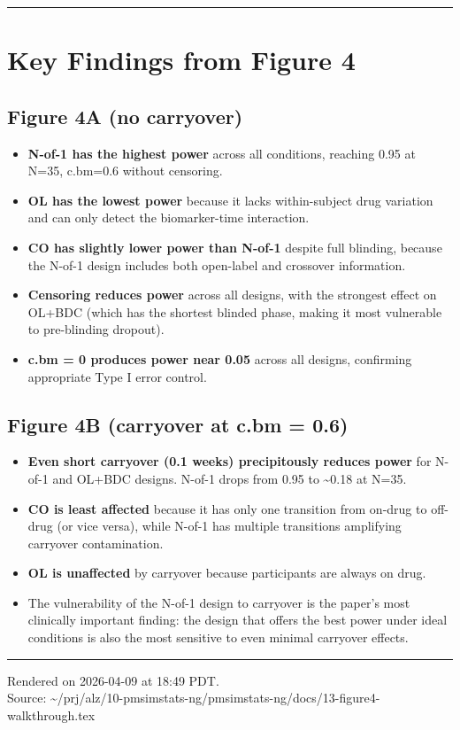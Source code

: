 \documentclass[11pt]{article}
\begin{document}
\bigskip\noindent\rule{\textwidth}{0.4pt}\bigskip

\section{Key Findings from Figure 4}

\subsection{Figure 4A (no carryover)}

\begin{itemize}
  \item \textbf{N-of-1 has the highest power} across all conditions, reaching
    0.95 at N=35, c.bm=0.6 without censoring.
  \item \textbf{OL has the lowest power} because it lacks within-subject drug
    variation and can only detect the biomarker-time interaction.
  \item \textbf{CO has slightly lower power than N-of-1} despite full blinding,
    because the N-of-1 design includes both open-label and
    crossover information.
  \item \textbf{Censoring reduces power} across all designs, with the strongest
    effect on OL+BDC (which has the shortest blinded phase,
    making it most vulnerable to pre-blinding dropout).
  \item \textbf{c.bm = 0 produces power near 0.05} across all designs,
    confirming appropriate Type I error control.
\end{itemize}

\subsection{Figure 4B (carryover at c.bm = 0.6)}

\begin{itemize}
  \item \textbf{Even short carryover (0.1 weeks) precipitously reduces power}
    for N-of-1 and OL+BDC designs. N-of-1 drops from 0.95 to
    \textasciitilde 0.18 at N=35.
  \item \textbf{CO is least affected} because it has only one transition from
    on-drug to off-drug (or vice versa), while N-of-1 has multiple
    transitions amplifying carryover contamination.
  \item \textbf{OL is unaffected} by carryover because participants are always
    on drug.
  \item The vulnerability of the N-of-1 design to carryover is the
    paper's most clinically important finding: the design that
    offers the best power under ideal conditions is also the most
    sensitive to even minimal carryover effects.
\end{itemize}

\vfill
\noindent\rule{\textwidth}{0.4pt}
{\footnotesize
Rendered on 2026-04-09 at 18:49 PDT.\\
Source: \textasciitilde/prj/alz/10-pmsimstats-ng/pmsimstats-ng/docs/13-figure4-walkthrough.tex}
\end{document}
